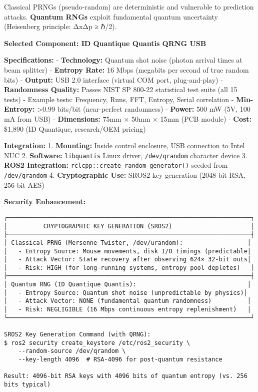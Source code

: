 \documentclass[
]{article}
\begin{document}
Classical PRNGs (pseudo-random) are deterministic and vulnerable to
prediction attacks. \textbf{Quantum RNGs} exploit fundamental quantum
uncertainty (Heisenberg principle: ΔxΔp ≥ ℏ/2).

\textbf{Selected Component: ID Quantique Quantis QRNG USB}

\textbf{Specifications:} - \textbf{Technology:} Quantum shot noise
(photon arrival times at beam splitter) - \textbf{Entropy Rate:} 16 Mbps
(megabits per second of true random bits) - \textbf{Output:} USB 2.0
interface (virtual COM port, plug-and-play) - \textbf{Randomness
Quality:} Passes NIST SP 800-22 statistical test suite (all 15 tests) -
Example tests: Frequency, Runs, FFT, Entropy, Serial correlation -
\textbf{Min-Entropy:} \textgreater0.99 bits/bit (near-perfect
randomness) - \textbf{Power:} 500 mW (5V, 100 mA from USB) -
\textbf{Dimensions:} 75mm × 50mm × 15mm (PCB module) - \textbf{Cost:}
\$1,890 (ID Quantique, research/OEM pricing)

\textbf{Integration:} 1. \textbf{Mounting:} Inside control enclosure,
USB connection to Intel NUC 2. \textbf{Software:} \texttt{libquantis}
Linux driver, \texttt{/dev/qrandom} character device 3. \textbf{ROS2
Integration:} \texttt{rclcpp::create\_random\_generator()} seeded from
\texttt{/dev/qrandom} 4. \textbf{Cryptographic Use:} SROS2 key
generation (2048-bit RSA, 256-bit AES)

\textbf{Security Enhancement:}

\begin{verbatim}
┌────────────────────────────────────────────────────────────────────┐
│          CRYPTOGRAPHIC KEY GENERATION (SROS2)                      │
├────────────────────────────────────────────────────────────────────┤
│ Classical PRNG (Mersenne Twister, /dev/urandom):                  │
│   - Entropy Source: Mouse movements, disk I/O timings (predictable│
│   - Attack Vector: State recovery after observing 624× 32-bit outs│
│   - Risk: HIGH (for long-running systems, entropy pool depletes)   │
├────────────────────────────────────────────────────────────────────┤
│ Quantum RNG (ID Quantique Quantis):                               │
│   - Entropy Source: Quantum shot noise (unpredictable by physics)│
│   - Attack Vector: NONE (fundamental quantum randomness)          │
│   - Risk: NEGLIGIBLE (16 Mbps continuous entropy replenishment)   │
└────────────────────────────────────────────────────────────────────┘

SROS2 Key Generation Command (with QRNG):
$ ros2 security create_keystore /etc/ros2_security \
    --random-source /dev/qrandom \
    --key-length 4096  # RSA-4096 for post-quantum resistance

Result: 4096-bit RSA keys with 4096 bits of quantum entropy (vs. 256 bits typical)
\end{verbatim}
\end{document}
